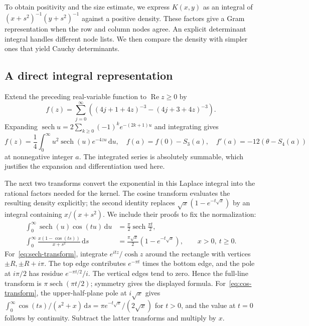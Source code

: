 \documentclass[11pt]{article}
\theoremstyle{definition}
\theoremstyle{remark}
\numberwithin{equation}{section}
\newcommand{\dd}{\,\mathrm d}
\DeclareMathOperator{\sech}{sech}
\DeclareMathOperator{\Ree}{Re}
\begin{document}
To obtain positivity and the size estimate, we express $K(x,y)$ as
an integral of $(x+s^2)^{-1}(y+s^2)^{-1}$ against a positive density.
These factors give a Gram representation when the row and column nodes
agree. An explicit determinant integral handles different node lists.
We then compare the density with simpler ones that yield Cauchy
determinants.

\subsection{A direct integral representation}

Extend the preceding real-variable function to $\Ree z\geq0$ by
\begin{equation}\label{eq:f}
 f(z)=\sum_{j=0}^{\infty}
 \left((4j+1+4z)^{-3}-(4j+3+4z)^{-3}\right).
\end{equation}
Expanding $\sech u=2\sum_{k\geq0}(-1)^ke^{-(2k+1)u}$ and integrating
gives
\begin{equation}\label{eq:f-laplace}
 f(z)=\frac14\int_0^\infty u^2\sech(u)e^{-4zu}\dd u,
 \quad f(a)=f(0)-S_3(a),\quad f'(a)=-12(\theta-S_4(a))
\end{equation}
at nonnegative integer $a$. The integrated series is absolutely summable,
which justifies the expansion and differentiation used here.

The next two transforms convert the exponential in this Laplace
integral into the rational factors needed for the kernel. The cosine
transform evaluates the resulting density explicitly; the second
identity replaces $\sqrt{x}(1-e^{-t\sqrt{x}})$ by an integral
containing $x/(x+s^2)$. We include their proofs to fix the normalization:
\begin{align}
 \int_0^\infty\sech(u)\cos(tu)\dd u
   &=\frac\pi2\sech\frac{\pi t}{2},\label{eq:sech-transform}\\
 \int_0^\infty\frac{x(1-\cos(ts))}{x+s^2}\dd s
   &=\frac{\pi\sqrt{x}}2(1-e^{-t\sqrt{x}}),
       \qquad x>0,\ t\geq0.\label{eq:cos-transform}
\end{align}
For~\eqref{eq:sech-transform}, integrate $e^{itz}/\cosh z$ around the
rectangle with vertices $\pm R,\pm R+i\pi$. The top edge contributes
$e^{-\pi t}$ times the bottom edge, and the pole at $i\pi/2$ has residue
$e^{-\pi t/2}/i$. The vertical edges tend to zero. Hence the full-line
transform is $\pi\sech(\pi t/2)$; symmetry gives the displayed formula.
For~\eqref{eq:cos-transform}, the upper-half-plane pole at $i\sqrt{x}$
gives
$\int_0^\infty\cos(ts)/(s^2+x)\dd s
 =\pi e^{-t\sqrt{x}}/(2\sqrt{x})$ for $t>0$, and the value at $t=0$
follows by continuity. Subtract the latter transforms and multiply by $x$.
\end{document}
